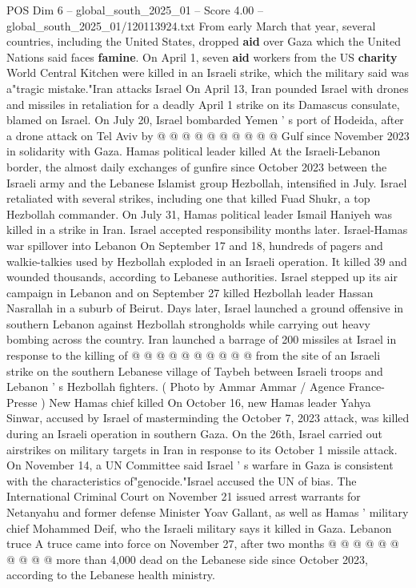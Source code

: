 \begin{textsample}{POS Dim 6 – global\_south\_2025\_01 – Score 4.00 – global\_south\_2025\_01/120113924.txt}
From early March that year, several countries, including the United States, dropped \textbf{aid} over Gaza which the United Nations said faces \textbf{famine}.
On April 1, seven \textbf{aid} workers from the US \textbf{charity} World Central Kitchen were killed in an Israeli strike, which the military said was a"tragic mistake."Iran attacks Israel On April 13, Iran pounded Israel with drones and missiles in retaliation for a deadly April 1 strike on its Damascus consulate, blamed on Israel.
On July 20, Israel bombarded Yemen ' s port of Hodeida, after a drone attack on Tel Aviv by @ @ @ @ @ @ @ @ @ @ Gulf since November 2023 in solidarity with Gaza.
Hamas political leader killed At the Israeli-Lebanon border, the almost daily exchanges of gunfire since October 2023 between the Israeli army and the Lebanese Islamist group Hezbollah, intensified in July.
Israel retaliated with several strikes, including one that killed Fuad Shukr, a top Hezbollah commander.
On July 31, Hamas political leader Ismail Haniyeh was killed in a strike in Iran.
Israel accepted responsibility months later.
Israel-Hamas war spillover into Lebanon On September 17 and 18, hundreds of pagers and walkie-talkies used by Hezbollah exploded in an Israeli operation.
It killed 39 and wounded thousands, according to Lebanese authorities.
Israel stepped up its air campaign in Lebanon and on September 27 killed Hezbollah leader Hassan Nasrallah in a suburb of Beirut.
Days later, Israel launched a ground offensive in southern Lebanon against Hezbollah strongholds while carrying out heavy bombing across the country.
Iran launched a barrage of 200 missiles at Israel in response to the killing of @ @ @ @ @ @ @ @ @ @ from the site of an Israeli strike on the southern Lebanese village of Taybeh between Israeli troops and Lebanon ' s Hezbollah fighters. ( Photo by Ammar Ammar / Agence France-Presse ) New Hamas chief killed On October 16, new Hamas leader Yahya Sinwar, accused by Israel of masterminding the October 7, 2023 attack, was killed during an Israeli operation in southern Gaza.
On the 26th, Israel carried out airstrikes on military targets in Iran in response to its October 1 missile attack.
On November 14, a UN Committee said Israel ' s warfare in Gaza is consistent with the characteristics of"genocide."Israel accused the UN of bias.
The International Criminal Court on November 21 issued arrest warrants for Netanyahu and former defense Minister Yoav Gallant, as well as Hamas ' military chief Mohammed Deif, who the Israeli military says it killed in Gaza.
Lebanon truce A truce came into force on November 27, after two months @ @ @ @ @ @ @ @ @ @ more than 4,000 dead on the Lebanese side since October 2023, according to the Lebanese health ministry.

\end{textsample}
